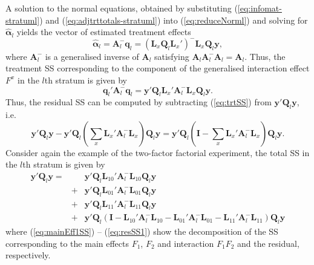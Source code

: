 \documentclass[article]{jss}
\newcommand{\I}{\mathbf{I}}
\newcommand{\Q}{\mathbf{Q}}
\newcommand{\A}{\mathbf{A}}
\newcommand{\mL}{\mathbf{L}}
\begin{document}
A solution to the normal equations, obtained by substituting (\ref{eq:infomat-stratuml}) and (\ref{eq:adjtrttotals-stratuml}) into (\ref{eq:reduceNorml}) and solving for $\hat{\bm{\alpha}}_l$ yields the vector of estimated treatment effects
\begin{equation}
\label{eq:trtVec}
\hat{\bm{\alpha}}_l = \A_{l}^{-} \bm{q}_l = (\mL_{x} \Q_l \mL_{x}')^{-} \mL_{x} \Q_l\bm{y},
\end{equation}
where $\A_{l}^{-}$ is a generalised inverse of $\A_{l}$ satisfying $\A_{l} \A_{l}^{-} \A_{l} = \A_{l}$. Thus, the treatment SS corresponding to the component of the generalised interaction effect $F^{x}$ in the $l$th stratum is given by 
\begin{equation}
\label{eq:trtSS}
 \bm{q}_{l}' \A_{l}^{-} \bm{q}_{l} = \bm{y}'\Q_l \mL_{x}' \A_{l}^{-} \mL_{x} \Q_l\bm{y}.
\end{equation}
Thus, the residual SS can be computed by subtracting (\ref{eq:trtSS}) from $\bm{y}' \Q_l\bm{y}$, i.e.\ 
\begin{equation}
\label{eq:resSS}
\bm{y}' \Q_l\bm{y} - \bm{y}'\Q_l \left(\sum_x \mL_{x}' \A_{l}^{-} \mL_{x} \right) \Q_l\bm{y} = \bm{y}'\Q_l \left( \I - \sum_x \mL_{x}' \A_{l}^{-} \mL_{x} \right) \Q_l\bm{y}.
\end{equation}
Consider again the example of the two-factor factorial experiment, the total SS in the $l$th stratum is given by 
\begin{eqnarray}
\bm{y}'\Q_l \bm{y} = && \bm{y}'\Q_l\mL_{10}' \A_{l}^{-} \mL_{10} \Q_l\bm{y}  		\label{eq:mainEff1SS} \\
					&+& \bm{y}'\Q_l\mL_{01}' \A_{l}^{-} \mL_{01} \Q_l\bm{y}  \label{eq:mainEff2SS} \\
					&+& \bm{y}'\Q_l\mL_{11}' \A_{l}^{-} \mL_{11} \Q_l\bm{y}  \label{eq:interSS}\\
					&+& \bm{y}'\Q_l(\I - \mL_{10}' \A_{l}^{-} \mL_{10} - \mL_{01}' \A_{l}^{-} \mL_{01} - \mL_{11}' \A_{l}^{-} \mL_{11}) \Q_l\bm{y} \label{eq:resSS1}
\end{eqnarray}
where (\ref{eq:mainEff1SS}) -- (\ref{eq:resSS1}) show the decomposition of the SS corresponding to the main effects $F_1$, $F_2$ and interaction $F_1F_2$ and the residual, respectively. 
\end{document}
